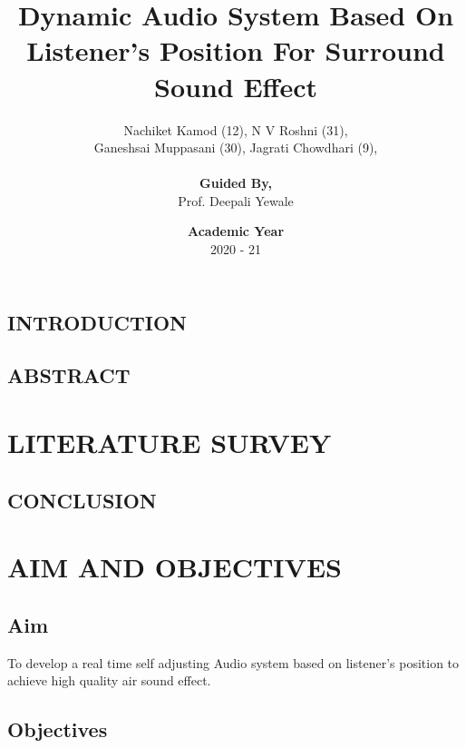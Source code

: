 \documentclass[twocolumn]{report}
\title{\textbf{Dynamic Audio System Based On Listener's Position For Surround Sound Effect}}
\author{Nachiket Kamod (12), N V Roshni (31),\\Ganeshsai Muppasani (30), Jagrati Chowdhari (9), \\\\\textbf{Guided By,}\\Prof. Deepali Yewale}
\date{\textbf{Academic Year}\\2020 - 21}
\begin{document}
\maketitle

\tableofcontents

\listoffigures

\chapter{}

\section{INTRODUCTION}



\section{ABSTRACT}



\chapter{LITERATURE SURVEY}



\section{CONCLUSION}



\chapter{AIM AND OBJECTIVES}

\section{Aim}

To develop a real time self adjusting Audio system based on listener's 
position to achieve high quality air sound effect.

\section{Objectives}
\end{document}
